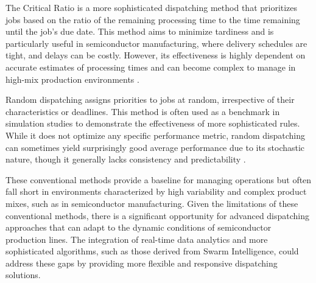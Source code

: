 The Critical Ratio is a more sophisticated dispatching method that prioritizes jobs based on the ratio of the remaining processing time to the time remaining until the job's due date. This method aims to minimize tardiness and is particularly useful in semiconductor manufacturing, where delivery schedules are tight, and delays can be costly. However, its effectiveness is highly dependent on accurate estimates of processing times and can become complex to manage in high-mix production environments \cite{baker1974}. 

Random dispatching assigns priorities to jobs at random, irrespective of their characteristics or deadlines. This method is often used as a benchmark in simulation studies to demonstrate the effectiveness of more sophisticated rules. While it does not optimize any specific performance metric, random dispatching can sometimes yield surprisingly good average performance due to its stochastic nature, though it generally lacks consistency and predictability \cite{blackstone1982}. 

These conventional methods provide a baseline for managing operations but often fall short in environments characterized by high variability and complex product mixes, such as in semiconductor manufacturing. %
Given the limitations of these conventional methods, there is a significant opportunity for advanced dispatching approaches that can adapt to the dynamic conditions of semiconductor production lines. The integration of real-time data analytics and more sophisticated algorithms, such as those derived from Swarm Intelligence, could address these gaps by providing more flexible and responsive dispatching solutions.


























